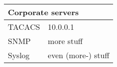 \begin{tabular}{|l|l|}
  \hline
  \multicolumn{2}{|l|}{Corporate servers}    \\
  \hline
  \hline
  TACACS    & 10.0.0.1       \\
  \hline
  SNMP      & more stuff         \\
  \hline
  Syslog    & even (more-) stuff       \\
  \hline
\end{tabular}
